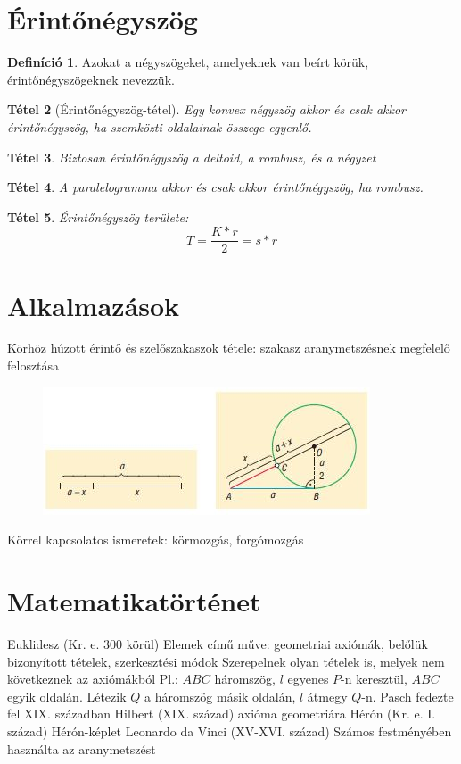 \documentclass[twoside,12pt]{report}
\newtheorem{theorem}{Tétel}[section]
\theoremstyle{definition}
\newtheorem{definition}[theorem]{Definíció}
\begin{document}
\section{Érintőnégyszög}
	\begin{definition}
		Azokat a négyszögeket, amelyeknek van beírt körük, érintőnégyszögeknek nevezzük.
	\end{definition}
	\begin{theorem}[Érintőnégyszög-tétel]
		Egy konvex négyszög akkor és csak akkor érintőnégyszög, ha szemközti oldalainak összege egyenlő.
	\end{theorem}
	\begin{theorem}
		Biztosan érintőnégyszög a deltoid, a rombusz, és a négyzet
	\end{theorem}
	\begin{theorem}
		A paralelogramma akkor és csak akkor érintőnégyszög, ha rombusz.
	\end{theorem}
	\begin{theorem}
		Érintőnégyszög területe:
		\begin{equation*}
			T=\frac{K*r}{2}=s*r
		\end{equation*}
	\end{theorem}
\section{Alkalmazások}
	\begin{outline}
		\1 Körhöz húzott érintő és szelőszakaszok tétele: szakasz aranymetszésnek megfelelő felosztása
		\begin{figure}[H]
			\centering
			\includegraphics[width=.7\linewidth]{Arany}
		\end{figure}
		\1 Körrel kapcsolatos ismeretek: körmozgás, forgómozgás
	\end{outline}
\section{Matematikatörténet}
	\begin{outline}
		\1 Euklidesz (Kr. e. 300 körül)
			\2 Elemek című műve: geometriai axiómák, belőlük bizonyított tételek, szerkesztési módok
			\2 Szerepelnek olyan tételek is, melyek nem következnek az axiómákból
			\2 Pl.:  $ABC$ háromszög, $l$ egyenes $P$-n keresztül, $ABC$ egyik oldalán. Létezik $Q$ a háromszög másik oldalán, $l$ átmegy $Q$-n.
				\3 Pasch fedezte fel XIX. században
		\1 Hilbert (XIX. század)
			 axióma geometriára 
		\1 Hérón (Kr. e. I. század)
			\2 Hérón-képlet
		\1 Leonardo da Vinci (XV-XVI. század)
			\2 Számos festményében használta az aranymetszést
	\end{outline}
\end{document}
